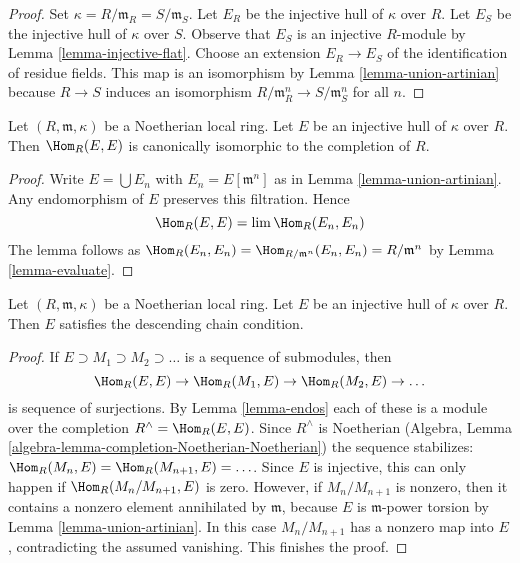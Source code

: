 \begin{proof}
Set $\kappa = R/\mathfrak m_R = S/\mathfrak m_S$.
Let $E_R$ be the injective hull of $\kappa$ over $R$.
Let $E_S$ be the injective hull of $\kappa$ over $S$.
Observe that $E_S$ is an injective $R$-module by
Lemma \ref{lemma-injective-flat}.
Choose an extension $E_R \to E_S$ of the identification of
residue fields. This map is an isomorphism by
Lemma \ref{lemma-union-artinian}
because $R \to S$ induces an isomorphism
$R/\mathfrak m_R^n \to S/\mathfrak m_S^n$ for all $n$.
\end{proof}

\begin{lemma}
\label{lemma-endos}
Let $(R, \mathfrak m, \kappa)$ be a Noetherian local ring.
Let $E$ be an injective hull of $\kappa$ over $R$. Then
$\Hom_R(E, E)$ is canonically isomorphic to the completion of $R$.
\end{lemma}

\begin{proof}
Write $E = \bigcup E_n$ with $E_n = E[\mathfrak m^n]$ as in
Lemma \ref{lemma-union-artinian}. Any endomorphism of $E$
preserves this filtration. Hence
$$
\Hom_R(E, E) = \lim \Hom_R(E_n, E_n)
$$
The lemma follows as
$\Hom_R(E_n, E_n) = \Hom_{R/\mathfrak m^n}(E_n, E_n) = R/\mathfrak m^n$
by Lemma \ref{lemma-evaluate}.
\end{proof}

\begin{lemma}
\label{lemma-injective-hull-has-dcc}
Let $(R, \mathfrak m, \kappa)$ be a Noetherian local ring.
Let $E$ be an injective hull of $\kappa$ over $R$. Then
$E$ satisfies the descending chain condition.
\end{lemma}

\begin{proof}
If $E \supset M_1 \supset M_2 \supset \ldots$ is a sequence of submodules, then
$$
\Hom_R(E, E) \to \Hom_R(M_1, E) \to \Hom_R(M_2, E) \to \ldots
$$
is sequence of surjections. By Lemma \ref{lemma-endos} each of these is a
module over the completion $R^\wedge = \Hom_R(E, E)$.
Since $R^\wedge$ is Noetherian
(Algebra, Lemma \ref{algebra-lemma-completion-Noetherian-Noetherian})
the sequence stabilizes: $\Hom_R(M_n, E) = \Hom_R(M_{n + 1}, E) = \ldots$.
Since $E$ is injective, this can only happen if $\Hom_R(M_n/M_{n + 1}, E)$
is zero. However, if $M_n/M_{n + 1}$ is nonzero, then it contains a
nonzero element annihilated by $\mathfrak m$, because $E$ is
$\mathfrak m$-power torsion by Lemma \ref{lemma-union-artinian}.
In this case $M_n/M_{n + 1}$ has a nonzero map into $E$, contradicting
the assumed vanishing. This finishes the proof.
\end{proof}

